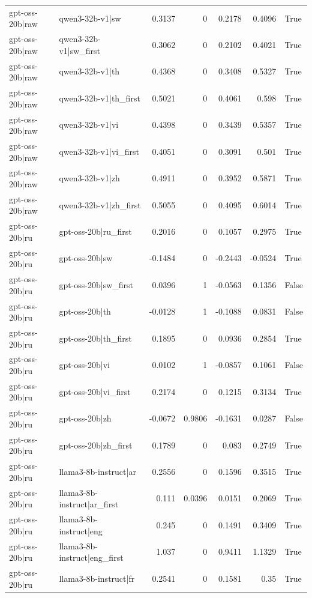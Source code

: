 \begin{table}
\begin{tabular}{l l r r r r l}
gpt-oss-20b|raw & qwen3-32b-v1|sw & 0.3137 & 0 & 0.2178 & 0.4096 & True \\
gpt-oss-20b|raw & qwen3-32b-v1|sw_first & 0.3062 & 0 & 0.2102 & 0.4021 & True \\
gpt-oss-20b|raw & qwen3-32b-v1|th & 0.4368 & 0 & 0.3408 & 0.5327 & True \\
gpt-oss-20b|raw & qwen3-32b-v1|th_first & 0.5021 & 0 & 0.4061 & 0.598 & True \\
gpt-oss-20b|raw & qwen3-32b-v1|vi & 0.4398 & 0 & 0.3439 & 0.5357 & True \\
gpt-oss-20b|raw & qwen3-32b-v1|vi_first & 0.4051 & 0 & 0.3091 & 0.501 & True \\
gpt-oss-20b|raw & qwen3-32b-v1|zh & 0.4911 & 0 & 0.3952 & 0.5871 & True \\
gpt-oss-20b|raw & qwen3-32b-v1|zh_first & 0.5055 & 0 & 0.4095 & 0.6014 & True \\
gpt-oss-20b|ru & gpt-oss-20b|ru_first & 0.2016 & 0 & 0.1057 & 0.2975 & True \\
gpt-oss-20b|ru & gpt-oss-20b|sw & -0.1484 & 0 & -0.2443 & -0.0524 & True \\
gpt-oss-20b|ru & gpt-oss-20b|sw_first & 0.0396 & 1 & -0.0563 & 0.1356 & False \\
gpt-oss-20b|ru & gpt-oss-20b|th & -0.0128 & 1 & -0.1088 & 0.0831 & False \\
gpt-oss-20b|ru & gpt-oss-20b|th_first & 0.1895 & 0 & 0.0936 & 0.2854 & True \\
gpt-oss-20b|ru & gpt-oss-20b|vi & 0.0102 & 1 & -0.0857 & 0.1061 & False \\
gpt-oss-20b|ru & gpt-oss-20b|vi_first & 0.2174 & 0 & 0.1215 & 0.3134 & True \\
gpt-oss-20b|ru & gpt-oss-20b|zh & -0.0672 & 0.9806 & -0.1631 & 0.0287 & False \\
gpt-oss-20b|ru & gpt-oss-20b|zh_first & 0.1789 & 0 & 0.083 & 0.2749 & True \\
gpt-oss-20b|ru & llama3-8b-instruct|ar & 0.2556 & 0 & 0.1596 & 0.3515 & True \\
gpt-oss-20b|ru & llama3-8b-instruct|ar_first & 0.111 & 0.0396 & 0.0151 & 0.2069 & True \\
gpt-oss-20b|ru & llama3-8b-instruct|eng & 0.245 & 0 & 0.1491 & 0.3409 & True \\
gpt-oss-20b|ru & llama3-8b-instruct|eng_first & 1.037 & 0 & 0.9411 & 1.1329 & True \\
gpt-oss-20b|ru & llama3-8b-instruct|fr & 0.2541 & 0 & 0.1581 & 0.35 & True \\

\end{tabular}
\end{table}
